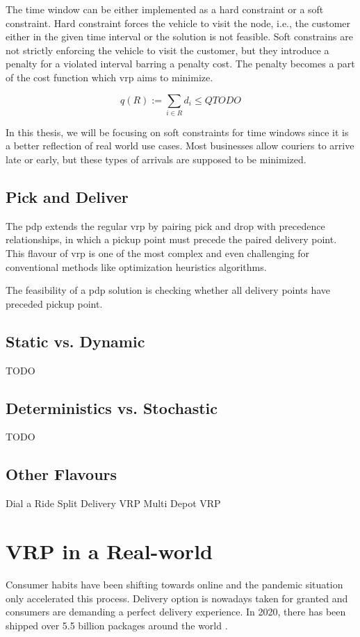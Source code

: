    The time window can be either implemented as a hard constraint or a soft constraint. Hard constraint forces the vehicle to visit the node, i.e., the customer either in the given time interval or the solution is not feasible. Soft constrains are not strictly enforcing the vehicle to visit the customer, but they introduce a penalty for a violated interval barring a penalty cost. The penalty becomes a part of the cost function which \gls{vrp} aims to minimize.
    
    \begin{equation}
        q(R) := \sum_{i \in R} d_i \leq Q TODO
    \end{equation}
    
    In this thesis, we will be focusing on soft constraints for time windows since it is a better reflection of real world use cases. Most businesses allow couriers to arrive late or early, but these types of arrivals are supposed to be minimized.
    
    \subsection{Pick and Deliver}
    The \gls{pdp} extends the regular \gls{vrp} by pairing pick and drop with precedence relationships, in which a pickup point must precede the paired delivery point. This flavour of \gls{vrp} is one of the most complex and even challenging for conventional methods like optimization heuristics algorithms.
    
    The feasibility of a \gls{pdp} solution is checking whether all delivery points have preceded pickup point.
    
    \subsection{Static vs. Dynamic}
    TODO
    \subsection{Deterministics vs. Stochastic}
    TODO
    
    \subsection{Other Flavours}
    Dial a Ride
    Split Delivery VRP
    Multi Depot VRP
    
\section{VRP in a Real-world}
Consumer habits have been shifting towards online and the pandemic situation only accelerated this process. Delivery option is nowadays taken for granted and consumers are demanding a perfect delivery experience. In 2020, there has been shipped over 5.5 billion packages around the world \cite{num-shipped-packages}.

